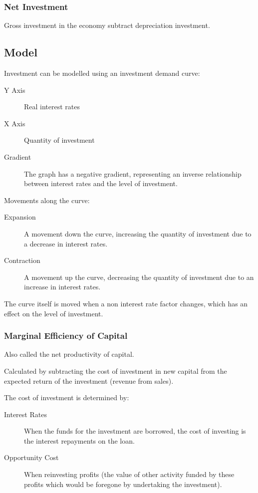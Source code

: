 \documentclass[a4paper,11pt]{report}
\begin{document}
\subsubsection{Net Investment}

Gross investment in the economy subtract depreciation investment.

\subsection{Model}


Investment can be modelled using an investment demand curve:

\begin{description}
\item [Y Axis] Real interest rates
\item [X Axis] Quantity of investment
\item [Gradient] The graph has a negative gradient, representing an inverse
	relationship between interest rates and the level of investment.
\end{description}

Movements along the curve:

\begin{description}
\item [Expansion] A movement down the curve, increasing the quantity of
	investment due to a decrease in interest rates.
\item [Contraction] A movement up the curve, decreasing the quantity of
	investment due to an increase in interest rates.
\end{description}

The curve itself is moved when a non interest rate factor changes, which has an
effect on the level of investment.

\subsubsection{Marginal Efficiency of Capital}

Also called the net productivity of capital.

Calculated by subtracting the cost of investment in new capital from the
expected return of the investment (revenue from sales).

The cost of investment is determined by:

\begin{description}
\item [Interest Rates] When the funds for the investment are borrowed, the cost
	of investing is the interest repayments on the loan.
\item [Opportunity Cost] When reinvesting profits (the value of other activity
	funded by these profits which would be foregone by undertaking the
	investment).
\end{description}
\end{document}
